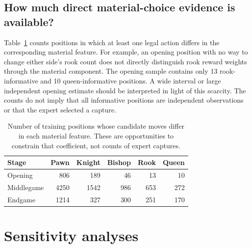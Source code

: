 \documentclass{jcst}
\begin{document}
\subsection{How much direct material-choice evidence is available?}
Table~\ref{tab:support} counts positions in which at least one legal action differs in the corresponding material feature. For example, an opening position with no way to change either side's rook count does not directly distinguish rook reward weights through the material component. The opening sample contains only 13 rook-informative and 10 queen-informative positions. A wide interval or large independent opening estimate should be interpreted in light of this scarcity. The counts do not imply that all informative positions are independent observations or that the expert selected a capture.
\begin{table}[tbp]\centering
\small
\caption{Number of training positions whose candidate moves differ in each material feature. These are opportunities to constrain that coefficient, not counts of expert captures.}\label{tab:support}
\begin{tabular}{lrrrrr}
\toprule
Stage & Pawn & Knight & Bishop & Rook & Queen\\\midrule
Opening & 806 & 189 & 46 & 13 & 10\\
Middlegame & 4250 & 1542 & 986 & 653 & 272\\
Endgame & 1214 & 327 & 300 & 251 & 170\\
\bottomrule\end{tabular}\end{table}


\section{Sensitivity analyses}
\end{document}
